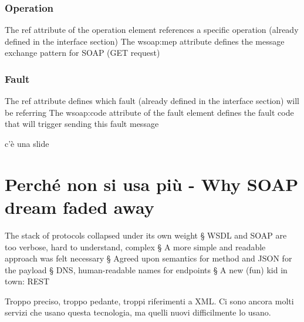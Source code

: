 \subsubsection{Operation}
The ref attribute of the operation element references a specific operation (already defined in the interface section)
The wsoap:mep attribute defines the message exchange pattern for SOAP (GET request)

\subsubsection{Fault}
The ref attribute defines which fault (already defined in the interface section) will be referring
The wsoap:code attribute of the fault element defines the fault code that will trigger sending this fault message

c'è una slide 

\section{Perché non si usa più - Why SOAP dream faded away}
The stack of protocols collapsed under its own weight
§ WSDL and SOAP are too verbose, hard to understand, complex
§ A more simple and readable approach was felt necessary
§ Agreed upon semantics for method and JSON for the payload
§ DNS, human-readable names for endpoints
§ A new (fun) kid in town: REST

Troppo preciso, troppo pedante, troppi riferimenti a XML. Ci sono ancora molti servizi che usano questa tecnologia, ma quelli nuovi difficilmente lo usano.